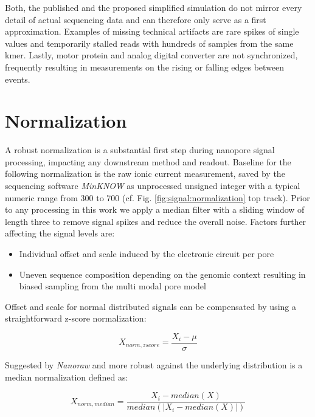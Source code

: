 Both, the published and the proposed simplified simulation do not mirror every detail of actual sequencing data and can therefore only serve as a first approximation. Examples of missing technical artifacts are rare spikes of single values and temporarily stalled reads with hundreds of samples from the same kmer. Lastly, motor protein and analog digital converter are not synchronized, frequently resulting in measurements on the rising or falling edges between events.




\section{Normalization}
\label{sec:signal:normalization}

A robust normalization is a substantial first step during nanopore signal processing, impacting any downstream method and readout. Baseline for the following normalization is the raw ionic current measurement, saved by the sequencing software \textit{MinKNOW} as unprocessed unsigned integer with a typical numeric range from 300 to 700 (cf. Fig. \ref{fig:signal:normalization} top track). Prior to any processing in this work we apply a median filter with a sliding window of length three to remove signal spikes and reduce the overall noise. Factors further affecting the signal levels are:

\begin{itemize}
	\item Individual offset and scale induced by the electronic circuit per pore
	\item Uneven sequence composition depending on the genomic context resulting in biased sampling from the multi modal pore model
\end{itemize}

Offset and scale for normal distributed signals can be compensated by using a straightforward z-score normalization:

\begin{equation}
	X_{norm,zscore} = \frac{X_{i} - \mu}{\sigma}
\end{equation}

Suggested by \textit{Nanoraw} \cite{Stoiber2017} and more robust against the underlying distribution is a median normalization defined as:

\begin{equation}
	X_{norm,median} = \frac{X_{i} - median(X)}{median(\left|X_{i}-median(X)\right|)}
\end{equation}

